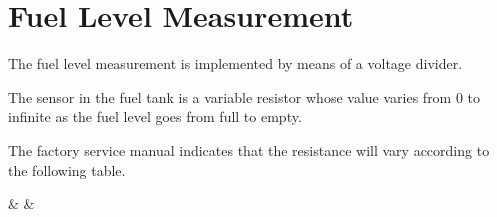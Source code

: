 \chapter{Fuel Level Measurement}

The fuel level measurement is implemented by means of a voltage divider\cite{some_voltage_divider_ref}.

The sensor in the fuel tank is a variable resistor whose value varies from 0 to infinite as the fuel level goes from full to empty.

The factory service manual indicates that the resistance will vary according to the following table.

%
{\thecsvrow & \resistance & \segments}%

